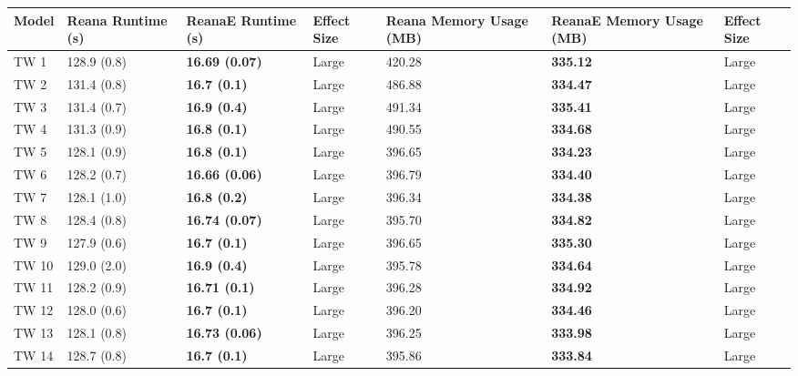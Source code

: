 \begin{tabular}{lllllll}
\toprule
 Model & Reana Runtime (s) &     ReanaE Runtime (s) & Effect Size & Reana Memory Usage (MB) & ReanaE Memory Usage (MB) & Effect Size \\
\midrule
  TW 1 &       128.9 (0.8) &  \textbf{16.69 (0.07)} &       Large &                  420.28 &          \textbf{335.12} &       Large \\
  TW 2 &       131.4 (0.8) &    \textbf{16.7 (0.1)} &       Large &                  486.88 &          \textbf{334.47} &       Large \\
  TW 3 &       131.4 (0.7) &    \textbf{16.9 (0.4)} &       Large &                  491.34 &          \textbf{335.41} &       Large \\
  TW 4 &       131.3 (0.9) &    \textbf{16.8 (0.1)} &       Large &                  490.55 &          \textbf{334.68} &       Large \\
  TW 5 &       128.1 (0.9) &    \textbf{16.8 (0.1)} &       Large &                  396.65 &          \textbf{334.23} &       Large \\
  TW 6 &       128.2 (0.7) &  \textbf{16.66 (0.06)} &       Large &                  396.79 &          \textbf{334.40} &       Large \\
  TW 7 &       128.1 (1.0) &    \textbf{16.8 (0.2)} &       Large &                  396.34 &          \textbf{334.38} &       Large \\
  TW 8 &       128.4 (0.8) &  \textbf{16.74 (0.07)} &       Large &                  395.70 &          \textbf{334.82} &       Large \\
  TW 9 &       127.9 (0.6) &    \textbf{16.7 (0.1)} &       Large &                  396.65 &          \textbf{335.30} &       Large \\
 TW 10 &       129.0 (2.0) &    \textbf{16.9 (0.4)} &       Large &                  395.78 &          \textbf{334.64} &       Large \\
 TW 11 &       128.2 (0.9) &   \textbf{16.71 (0.1)} &       Large &                  396.28 &          \textbf{334.92} &       Large \\
 TW 12 &       128.0 (0.6) &    \textbf{16.7 (0.1)} &       Large &                  396.20 &          \textbf{334.46} &       Large \\
 TW 13 &       128.1 (0.8) &  \textbf{16.73 (0.06)} &       Large &                  396.25 &          \textbf{333.98} &       Large \\
 TW 14 &       128.7 (0.8) &    \textbf{16.7 (0.1)} &       Large &                  395.86 &          \textbf{333.84} &       Large \\

\end{tabular}
